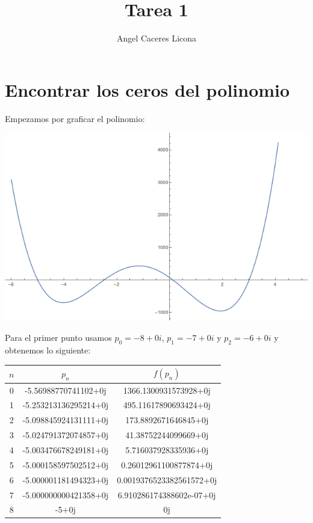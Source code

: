 \documentclass{article}
\begin{document}
\title{Tarea 1}
\author{Angel Caceres Licona}

\maketitle


\section{Encontrar los ceros del polinomio}
Empezamos por graficar el polinomio:
\begin{center}
    \includegraphics[scale=0.5]{grafica1.png}    
\end{center}

Para el primer punto usamos $p_0 = -8 + 0i$, $p_1 = -7 + 0i$ y $p_2 = -6 + 0i$ y obtenemos lo siguiente:

\begin{center}
    \begin{tabular}{||c c c||} 
    \hline
    $n$ & $p_{n}$ & $f(p_n)$ \\ [0.5ex] 
    \hline
    0 & -5.56988770741102+0j & 1366.1300931573928+0j\\
    \hline
    1 & -5.253213136295214+0j & 495.11617890693424+0j \\
    \hline
    2 & -5.098845924131111+0j & 173.8892671646845+0j \\
    \hline
    3 & -5.024791372074857+0j & 41.38752244099669+0j \\ 
    \hline
    4 & -5.003476678249181+0j & 5.716037928335936+0j \\ 
    \hline
    5 & -5.000158597502512+0j & 0.26012961100877874+0j \\ 
    \hline
    6 & -5.000001181494323+0j & 0.0019376523382561572+0j \\ 
    \hline
    7 & -5.000000000421358+0j & 6.910286174388602e-07+0j \\ 
    \hline
    8 & -5+0j & 0j \\ [1ex]
    \hline
   \end{tabular}
\end{center}
\end{document}
